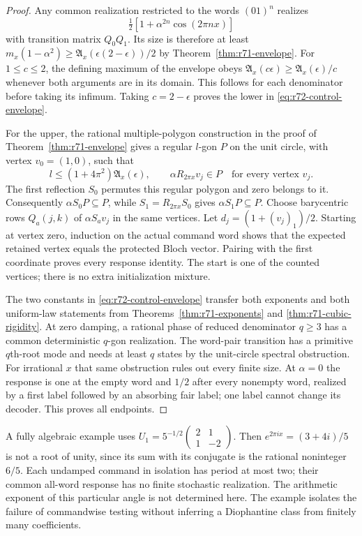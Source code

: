 \begin{proof}
Any common realization restricted to the words $(01)^n$ realizes
\[
 \tfrac12[1+\alpha^{2n}\cos(2\pi nx)]
\]
with transition matrix $Q_0Q_1$. Its size is therefore at least
$m_x(1-\alpha^2)\ge\mathfrak A_x(\epsilon(2-\epsilon))/2$
by Theorem~\ref{thm:r71-envelope}. For $1\le c\le2$, the defining maximum of the envelope obeys $\mathfrak A_x(c\epsilon)\ge\mathfrak A_x(\epsilon)/c$ whenever both arguments are in its domain. This follows for each denominator before taking its infimum. Taking $c=2-\epsilon$ proves the lower in \eqref{eq:r72-control-envelope}.

For the upper, the rational multiple-polygon construction in the proof of Theorem~\ref{thm:r71-envelope} gives a regular $l$-gon $P$ on the unit circle, with vertex $v_0=(1,0)$, such that
\[
 l\le(1+4\pi^2)\mathfrak A_x(\epsilon),\qquad
 \alpha R_{2\pi x}v_j\in P\quad\text{for every vertex }v_j.
\]
The first reflection $S_0$ permutes this regular polygon and zero belongs to it. Consequently $\alpha S_0P\subseteq P$, while $S_1=R_{2\pi x}S_0$ gives $\alpha S_1P\subseteq P$. Choose barycentric rows $Q_a(j,k)$ of $\alpha S_av_j$ in the same vertices. Let $d_j=(1+(v_j)_1)/2$. Starting at vertex zero, induction on the actual command word shows that the expected retained vertex equals the protected Bloch vector. Pairing with the first coordinate proves every response identity. The start is one of the counted vertices; there is no extra initialization mixture.

The two constants in \eqref{eq:r72-control-envelope} transfer both exponents and both uniform-law statements from Theorems~\ref{thm:r71-exponents} and \ref{thm:r71-cubic-rigidity}. At zero damping, a rational phase of reduced denominator $q\ge3$ has a common deterministic $q$-gon realization. The word-pair transition has a primitive $q$th-root mode and needs at least $q$ states by the unit-circle spectral obstruction. For irrational $x$ that same obstruction rules out every finite size. At $\alpha=0$ the response is one at the empty word and $1/2$ after every nonempty word, realized by a first label followed by an absorbing fair label; one label cannot change its decoder. This proves all endpoints.
\end{proof}

A fully algebraic example uses $U_1=5^{-1/2}\left(\begin{smallmatrix}2&1\\1&-2\end{smallmatrix}\right)$. Then $e^{2\pi ix}=(3+4i)/5$ is not a root of unity, since its sum with its conjugate is the rational noninteger $6/5$. Each undamped command in isolation has period at most two; their common all-word response has no finite stochastic realization. The arithmetic exponent of this particular angle is not determined here. The example isolates the failure of commandwise testing without inferring a Diophantine class from finitely many coefficients.

